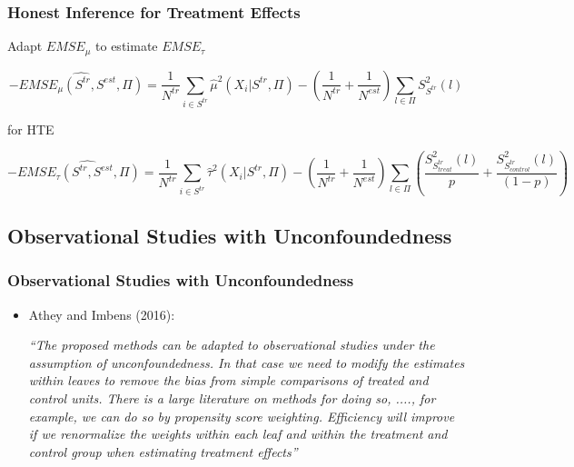 \documentclass[
  shownotes,
  xcolor={svgnames},
  hyperref={colorlinks,citecolor=DarkBlue,linkcolor=DarkRed,urlcolor=DarkBlue}
  , aspectratio=169]{beamer}
\begin{document}
\begin{frame}[fragile]
\frametitle{Honest Inference for Treatment Effects}



Adapt $EMSE_{\mu}$ to estimate $EMSE_{\tau}$

\[
-\hat{EMSE_{\mu}(S^{tr},S^{est},\Pi)}=\frac{1}{N^{tr}}\sum_{i\in S^{tr}}\hat{\mu}^{2}(X_{i}|S^{tr},\Pi)-\left(\frac{1}{N^{tr}}+\frac{1}{N^{est}}\right)\sum_{l\in\Pi}S_{S^{tr}}^{2}(l)
\]

for HTE

\[
-\hat{EMSE_{\tau}(S^{tr},S^{est},\Pi)=}\frac{1}{N^{tr}}\sum_{i\in S^{tr}}\hat{\tau}^{2}(X_{i}|S^{tr},\Pi)-\left(\frac{1}{N^{tr}}+\frac{1}{N^{est}}\right)\sum_{l\in\Pi}\left(\frac{S_{S_{treat}^{tr}}^{2}(l)}{p}+\frac{S_{S_{control}^{tr}}^{2}(l)}{(1-p)}\right)
\]


\end{frame}
\subsection{Observational Studies with Unconfoundedness}
\begin{frame}[fragile]
\frametitle{Observational Studies with Unconfoundedness}

\begin{itemize}
\item Athey and Imbens (2016):

\medskip

{\it ``The proposed methods can be adapted to observational studies under the assumption of unconfoundedness. In that case we need to modify the estimates within leaves to remove the bias from simple comparisons of treated and control units. There is a large literature on methods for doing so, ...., for example, we can do so by propensity score weighting. Efficiency will improve if we renormalize the weights within each leaf and within the treatment and control group when estimating treatment effects''}
\end{itemize}

\end{frame}

\end{document}
